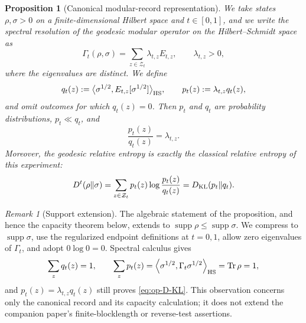 \documentclass[11pt]{article}
\newtheorem{proposition}[proposition]{Proposition}
\theoremstyle{remark}
\newtheorem{remark}[remark]{Remark}
\newcommand{\1}{\mathbbm{1}}
\begin{document}
\begin{proposition}[Canonical modular-record representation]
\label{prop:op-canonical-record}
We take states $\rho,\sigma>0$ on a finite-dimensional Hilbert space
and $t\in[0,1]$, and we write the spectral resolution of the geodesic
modular operator on the Hilbert--Schmidt space as
\begin{equation}
 \Gamma_t(\rho,\sigma)
 =\sum_{z\in\mathcal Z_t}\lambda_{t,z}E_{t,z},
 \qquad \lambda_{t,z}>0,
 \label{eq:op-Gamma-spectral-resolution}
\end{equation}
where the eigenvalues are distinct.  We define
\begin{equation}
 q_t(z):=\big\langle\sigma^{1/2},
 E_{t,z}[\sigma^{1/2}]\big\rangle_{\rm HS},
 \qquad
 p_t(z):=\lambda_{t,z}q_t(z),
 \label{eq:op-pq-def}
\end{equation}
and omit outcomes for which $q_t(z)=0$.  Then $p_t$ and $q_t$ are
probability distributions, $p_t\ll q_t$, and
\begin{equation}
 \frac{p_t(z)}{q_t(z)}=\lambda_{t,z}.
 \label{eq:op-record-likelihood-ratio}
\end{equation}
Moreover, the geodesic relative entropy is exactly the classical
relative entropy of this experiment:
\begin{equation}
 D^t(\rho\Vert\sigma)
 =\sum_{z\in\mathcal Z_t}p_t(z)
   \log\frac{p_t(z)}{q_t(z)}
 =D_{\rm KL}(p_t\Vert q_t).
 \label{eq:op-D-KL}
\end{equation}
\end{proposition}

\begin{remark}[Support extension]
The algebraic statement of the proposition, and hence the capacity
theorem below, extends to
$\operatorname{supp}\rho\leq\operatorname{supp}\sigma$.  We
compress to $\operatorname{supp}\sigma$, use the regularized endpoint
definitions at $t=0,1$, allow zero eigenvalues of $\Gamma_t$, and
adopt $0\log0=0$.  Spectral calculus gives
\begin{equation}
 \sum_zq_t(z)=1,
 \qquad
 \sum_zp_t(z)
 =\left\langle\sigma^{1/2},
   \Gamma_t\sigma^{1/2}\right\rangle_{\rm HS}
 =\operatorname{Tr}\rho=1,
\end{equation}
and $p_t(z)=\lambda_{t,z}q_t(z)$ still proves
\eqref{eq:op-D-KL}.  This observation concerns only the canonical
record and its capacity calculation; it does not extend the companion
paper's finite-blocklength or reverse-test assertions.
\end{remark}
\end{document}
